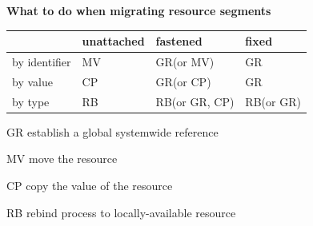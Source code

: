 \textbf{What to do when migrating resource segments} \\
\begin{tabular}{l| l| l| l}
			&	unattached	&	fastened		&	fixed \\ \hline
by identifier	& 	MV			&	GR(or MV)		& 	GR \\ \hline
by value		&	CP			&	GR(or CP)		&	GR \\ \hline
by type		&	RB			&	RB(or GR, CP)	&	RB(or GR) \\
\end{tabular} 

\begin{compactdesc}
	\item[GR] establish a global systemwide reference
	\item[MV]  move the resource
	\item[CP]  copy the value of the resource
	\item[RB] rebind process to locally-available resource
\end{compactdesc}


